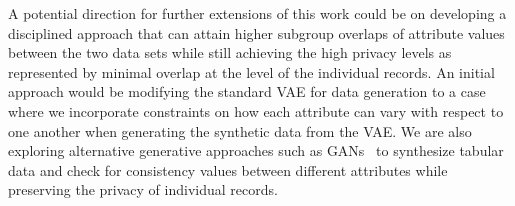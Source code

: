 \documentclass[dvipdft]{article}
\begin{document}
A potential direction for further extensions of this work could be on developing a disciplined approach that can attain higher subgroup overlaps of attribute values between the two data sets while still achieving the high privacy levels as represented by minimal overlap at the level of the individual records. An initial approach would be modifying the standard VAE for data generation to a case where we incorporate constraints on how each attribute can vary with respect to one another when generating the synthetic data from the VAE. We are also exploring alternative generative approaches such as GANs~\cite{park2018data, kumar2018ecommercegan} to synthesize tabular data and check for consistency values between different attributes while preserving the privacy of individual records.





\end{document}
